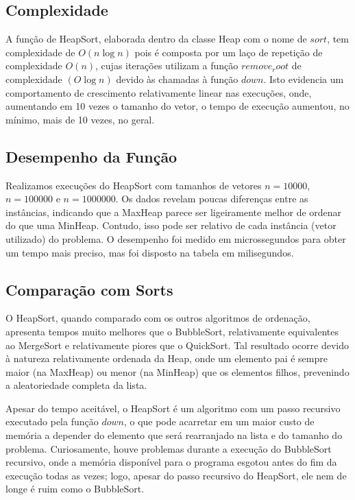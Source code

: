\documentclass[12pt]{article}
\begin{document}
\subsection{Complexidade}
A função de HeapSort, elaborada dentro da classe Heap com o nome de $sort$, tem complexidade de $O(n \log n)$ pois é composta por um laço de repetição de complexidade $O(n)$, cujas iterações utilizam a função $remove_root$ de complexidade $(O \log n)$ devido às chamadas à função $down$. Isto evidencia um comportamento de crescimento relativamente linear nas execuções, onde, aumentando em 10 vezes o tamanho do vetor, o tempo de execução aumentou, no mínimo, mais de 10 vezes, no geral.

\subsection{Desempenho da Função}
Realizamos execuções do HeapSort com tamanhos de vetores $n = 10000$, $n = 100000$ e $n = 1000000$. Os dados revelam poucas diferenças entre as instâncias, indicando que a MaxHeap parece ser ligeiramente melhor de ordenar do que uma MinHeap. Contudo, isso pode ser relativo de cada instância (vetor utilizado) do problema. O desempenho foi medido em microssegundos para obter um tempo mais preciso, mas foi disposto na tabela em milisegundos.

\subsection{Comparação com Sorts}
O HeapSort, quando comparado com os outros algoritmos de ordenação, apresenta tempos muito melhores que o BubbleSort, relativamente equivalentes ao MergeSort e relativamente piores que o QuickSort. Tal resultado ocorre devido à natureza relativamente ordenada da Heap, onde um elemento pai é sempre maior (na MaxHeap) ou menor (na MinHeap) que os elementos filhos, prevenindo a aleatoriedade completa da lista. 

Apesar do tempo aceitável, o HeapSort é um algoritmo com um passo recursivo executado pela função $down$, o que pode acarretar em um maior custo de memória a depender do elemento que será rearranjado na lista e do tamanho do problema. Curiosamente, houve problemas durante a execução do BubbleSort recursivo, onde a memória disponível para o programa esgotou antes do fim da execução todas as vezes; logo, apesar do passo recursivo do HeapSort, ele nem de longe é ruim como o BubbleSort.
\end{document}
